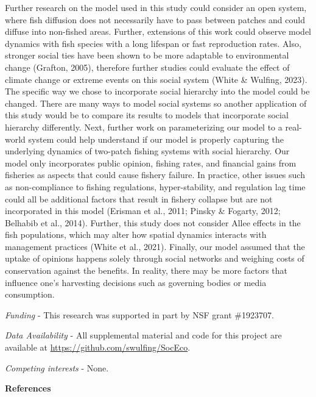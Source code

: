 \documentclass[
  12pt,
]{article}
\begin{document}
Further research on the model used in this study could consider an open system, where fish diffusion does not necessarily have to pass between patches and could diffuse into non-fished areas. Further, extensions of this work could observe model dynamics with fish species with a long lifespan or fast reproduction rates. Also, stronger social ties have been shown to be more adaptable to environmental change (Grafton, 2005), therefore further studies could evaluate the effect of climate change or extreme events on this social system (White \& Wulfing, 2023). The specific way we chose to incorporate social hierarchy into the model could be changed. There are many ways to model social systems so another application of this study would be to compare its results to models that incorporate social hierarchy differently. Next, further work on parameterizing our model to a real-world system could help understand if our model is properly capturing the underlying dynamics of two-patch fishing systems with social hierarchy. Our model only incorporates public opinion, fishing rates, and financial gains from fisheries as aspects that could cause fishery failure. In practice, other issues such as non-compliance to fishing regulations, hyper-stability, and regulation lag time could all be additional factors that result in fishery collapse but are not incorporated in this model (Erisman et al., 2011; Pinsky \& Fogarty, 2012; Belhabib et al., 2014). Further, this study does not consider Allee effects in the fish populations, which may alter how spatial dynamics interacts with management practices (White et al., 2021). Finally, our model assumed that the uptake of opinions happens solely through social networks and weighing costs of conservation against the benefits. In reality, there may be more factors that influence one's harvesting decisions such as governing bodies or media consumption.

\emph{Funding} - This research was supported in part by NSF grant \#1923707.

\emph{Data Availability} - All supplemental material and code for this project are available at \url{https://github.com/swulfing/SocEco}.

\emph{Competing interests} - None.

\newpage

\textbf{References}
\end{document}
